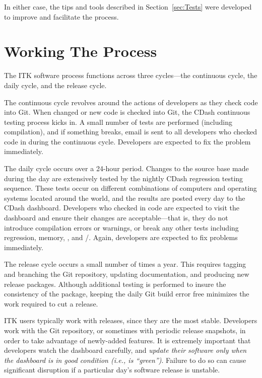 In either case, the tips and tools described in Section~\ref{sec:Tests} were
developed to improve and facilitate the process.

\section{Working The Process}
\label{sec:WorkingTheProcess}

The ITK software process functions across three cycles---the continuous
cycle, the daily cycle, and the release cycle.

The continuous cycle revolves around the actions of developers as they check
code into Git. When changed or new code is checked into Git, the CDash
continuous testing process kicks in. A small number of tests are performed
(including compilation), and if something breaks, email is sent to all
developers who checked code in during the continuous cycle. Developers are
expected to fix the problem immediately.

The daily cycle occurs over a 24-hour period. Changes to the source base made
during the day are extensively tested by the nightly CDash regression testing
sequence. These tests occur on different combinations of computers and
operating systems located around the world, and the results are posted every
day to the CDash dashboard. Developers who checked in code are expected to
visit the dashboard and ensure their changes are acceptable---that is, they
do not introduce compilation errors or warnings, or break any other tests
including regression, memory, , and /.
Again, developers are expected to fix problems immediately.

The release cycle occurs a small number of times a year. This requires
tagging and branching the Git repository, updating documentation, and
producing new release packages. Although additional testing is performed to
insure the consistency of the package, keeping the daily Git build error free
minimizes the work required to cut a release.

ITK users typically work with releases, since they are the most
stable. Developers work with the Git repository, or sometimes with periodic
release snapshots, in order to take advantage of newly-added features. It is
extremely important that developers watch the dashboard carefully, and
\emph{update their software only when the dashboard is in good condition
(i.e., is ``green'')}. Failure to do so can cause significant disruption if a
particular day's software release is unstable.

